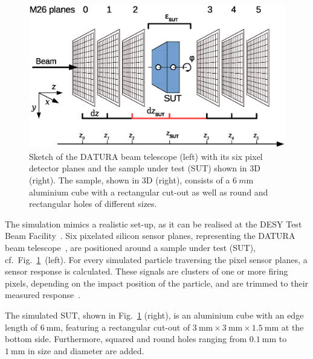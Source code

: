 \documentclass{PoS}
\newcommand{\Datura}{\ensuremath{\textrm{DATURA}}}
\begin{document}
\begin{figure}[!bp]
	\center
	\includegraphics[trim= 50 180 220 20, width=.55\linewidth]{figures/sketch_tscope.eps}
	\hspace{30pt}
	\caption[Sketch of the Datura beam telescope]{%
	Sketch of the $\Datura$ beam telescope (left) with its six pixel detector planes and the sample under test (SUT) shown in 3D (right). %
	The sample, shown in 3D (right), consists of a $\SI{6}{m\meter}$ aluminium cube with a rectangular cut-out as well as round and rectangular holes of different sizes.
	}
	\label{fig:setup}
\end{figure}

The simulation mimics a realistic set-up, as it can be realised at the DESY Test Beam Facility~\cite{ref:DESYtb}. 
Six pixelated  silicon sensor planes, representing the DATURA beam telescope~\cite{JansenEPJ}, are positioned around a sample under test (SUT), cf.\ Fig.~\ref{fig:setup}~(left). 
For every simulated particle traversing the pixel sensor planes, a sensor response is calculated. 
These signals are clusters of one or more firing pixels,
 depending on the impact position of the particle, and are trimmed to their measured response~\cite{ref:datura-inpixel}.

The simulated SUT, shown in Fig.~\ref{fig:setup} (right), is an aluminium cube with an edge length of $\SI{6}{\mm}$,
 featuring a rectangular cut-out of $\SI{3}{\mm}\times\SI{3}{\mm}\times\SI{1.5}{\mm}$ at the bottom side. 
Furthermore, squared and round holes ranging from $\SI{0.1}{\mm}$ to $\SI{1}{\mm}$ in size and diameter are added.%
\end{document}
